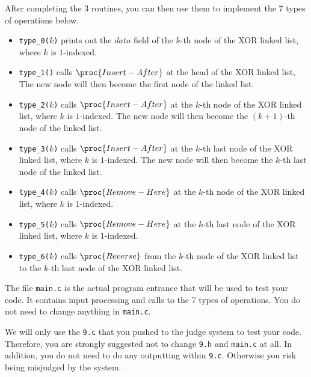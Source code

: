 After completing the 3 routines, you can then use them to implement the 7 types of operations below.
\begin{itemize}
    \item \texttt{type\_0(}$k$\texttt{)} prints out the $data$ field of the $k$-th node of the XOR linked list, where $k$ is $1$-indexed.
    
    \item \texttt{type\_1()} calls $\proc{Insert-After}$ at the head of the XOR linked list, The new node will then become the first node of the linked list.
    
    \item \texttt{type\_2(}$k$\texttt{)} calls $\proc{Insert-After}$ at the $k$-th node of the XOR linked list, where $k$ is $1$-indexed. The new node will then become the $(k+1)$-th node of the linked list.
    
    \item \texttt{type\_3(}$k$\texttt{)} calls $\proc{Insert-After}$ at the $k$-th last node of the XOR linked list, where $k$ is $1$-indexed. The new node will then become the $k$-th last node of the linked list.
    
    \item \texttt{type\_4(}$k$\texttt{)} calls $\proc{Remove-Here}$ at the $k$-th node of the XOR linked list, where $k$ is $1$-indexed.
    
    \item \texttt{type\_5(}$k$\texttt{)} calls $\proc{Remove-Here}$ at the $k$-th last node of the XOR linked list, where $k$ is $1$-indexed. 
    
    \item \texttt{type\_6(}$k$\texttt{)} calls $\proc{Reverse}$ from the $k$-th node of the XOR linked list to the $k$-th last node of the XOR linked list.
\end{itemize}

The file \texttt{main.c} is the actual program entrance that will be used to test your code. It contains input processing and calls to the 7 types of operations. You do not need to change anything in \texttt{main.c}. 

We will only use the \texttt{9.c} that you pushed to the judge system to test your code. Therefore, you are strongly suggested not to change \texttt{9.h} and \texttt{main.c} at all. In addition, you do not need to do any outputting within \texttt{9.c}. Otherwise you risk being misjudged by the system.

\newpage

